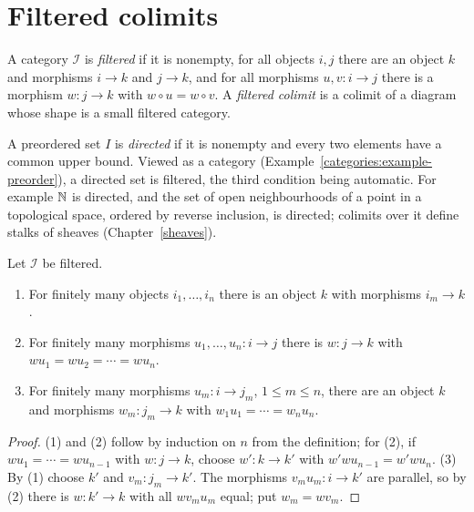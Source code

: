 \section{Filtered colimits}\label{categories:section-filtered-colimits}

\begin{definition}\label{categories:definition-filtered}
A category $\mathcal{I}$ is \emph{filtered} if it is nonempty, for all objects
$i, j$ there are an object $k$ and morphisms $i \to k$ and $j \to k$, and for all
morphisms $u, v \colon i \to j$ there is a morphism $w \colon j \to k$ with
$w \circ u = w \circ v$. A \emph{filtered colimit} is a colimit of a diagram whose
shape is a small filtered category.
\end{definition}

\begin{example}\label{categories:example-directed}
A preordered set $I$ is \emph{directed} if it is nonempty and every two elements
have a common upper bound. Viewed as a category
(Example~\ref{categories:example-preorder}), a directed set is filtered, the
third condition being automatic. For example $\mathbb{N}$ is directed, and the set of
open neighbourhoods of a point in a topological space, ordered by reverse
inclusion, is directed; colimits over it define stalks of sheaves
(Chapter~\ref{sheaves}).
\end{example}

\begin{lemma}\label{categories:lemma-filtered-finite}
Let $\mathcal{I}$ be filtered.
\begin{enumerate}
\item For finitely many objects $i_1, \ldots, i_n$ there is an object $k$ with
morphisms $i_m \to k$.
\item For finitely many morphisms $u_1, \ldots, u_n \colon i \to j$ there is
$w \colon j \to k$ with $w u_1 = w u_2 = \cdots = w u_n$.
\item For finitely many morphisms $u_m \colon i \to j_m$, $1 \leq m \leq n$, there
are an object $k$ and morphisms $w_m \colon j_m \to k$ with
$w_1 u_1 = \cdots = w_n u_n$.
\end{enumerate}
\end{lemma}

\begin{proof}
(1) and (2) follow by induction on $n$ from the definition; for (2), if
$w u_1 = \cdots = w u_{n-1}$ with $w \colon j \to k$, choose $w' \colon k \to k'$ with
$w' w u_{n-1} = w' w u_n$. (3) By (1) choose $k'$ and $v_m \colon j_m \to k'$. The
morphisms $v_m u_m \colon i \to k'$ are parallel, so by (2) there is $w \colon k' \to k$
with all $w v_m u_m$ equal; put $w_m = w v_m$.
\end{proof}

